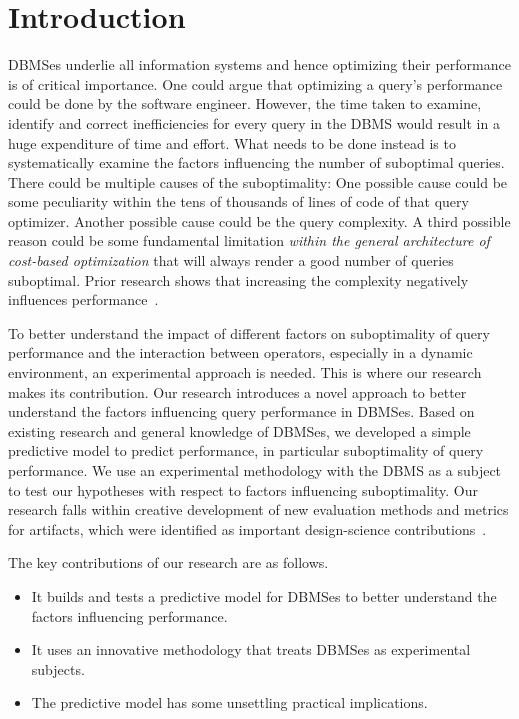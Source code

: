 \section{Introduction}
DBMSes
underlie all information systems and hence optimizing their performance is of
critical importance. One could argue that optimizing a query's performance
could be done by the software engineer. However, the time taken to examine,
identify and correct inefficiencies for every query in the DBMS would result
in a huge expenditure of time and effort. What needs to be done instead is
to systematically examine the factors influencing the number of suboptimal
queries. There could be multiple causes of the suboptimality: One possible
cause could be some peculiarity within the tens of thousands of lines of
code of that query optimizer. Another possible cause could be the query
complexity. A third possible reason could be some fundamental limitation
{\em within the general architecture of cost-based optimization} that will
always render a good number of queries suboptimal. Prior research shows that
increasing the complexity negatively influences
performance~\cite{campbell88,moody98}.

To better understand the impact of different factors on suboptimality of
query performance and the interaction between operators, especially in a
dynamic environment, an experimental approach is needed. This is where our
research makes its contribution.  Our research introduces a novel approach
to better understand the factors influencing query performance in
DBMSes. Based on existing research and general knowledge of DBMSes, we
developed a simple predictive model to predict performance, in particular
suboptimality of query performance. We use an experimental methodology with
the DBMS as a subject to test our hypotheses with respect to factors
influencing suboptimality. Our research falls within creative development of
new evaluation methods and metrics for artifacts, which were identified as
important design-science contributions~\cite{hevner04}.

The key contributions of our research are as follows.
\begin{itemize}
\item It builds and tests a predictive model for DBMSes to better understand the factors influencing performance.

\item It uses an innovative methodology that treats DBMSes as experimental subjects.

\item The predictive model has some unsettling practical implications.
\end{itemize}

